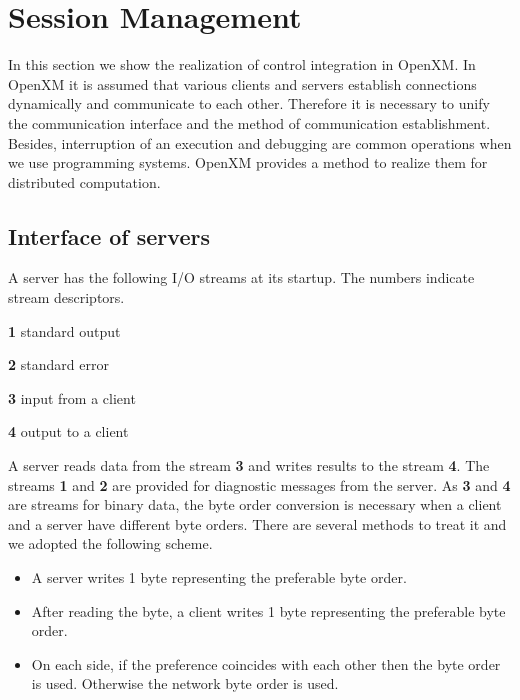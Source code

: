 
\section{Session Management}
\label{secsession}
 
In this section we show the realization of control integration in
OpenXM.  In OpenXM it is assumed that various clients and servers
establish connections dynamically and communicate to each
other. Therefore it is necessary to unify the communication interface
and the method of communication establishment.  Besides, interruption
of an execution and debugging are common operations when we use
programming systems. OpenXM provides a method to realize them for
distributed computation.

\subsection{Interface of servers}

A server has the following I/O streams at its startup. The numbers
indicate stream descriptors.

\begin{description}
\item{\bf 1} standard output
\item{\bf 2} standard error
\item{\bf 3} input from a client
\item{\bf 4} output to a client
\end{description}

A server reads data from the stream {\bf 3} and writes results to the
stream {\bf 4}. The streams {\bf 1} and {\bf 2} are provided for
diagnostic messages from the server.  As {\bf 3} and {\bf 4} are
streams for binary data, the byte order conversion is necessary when a
client and a server have different byte orders. There are several
methods to treat it and we adopted the following scheme.

\begin{itemize}
\item A server writes 1 byte representing the preferable byte order.
\item After reading the byte, a client writes 1 byte representing the
preferable byte order.
\item On each side, if the preference coincides with each other then
the byte order is used. Otherwise the network byte order is used.
\end{itemize}

